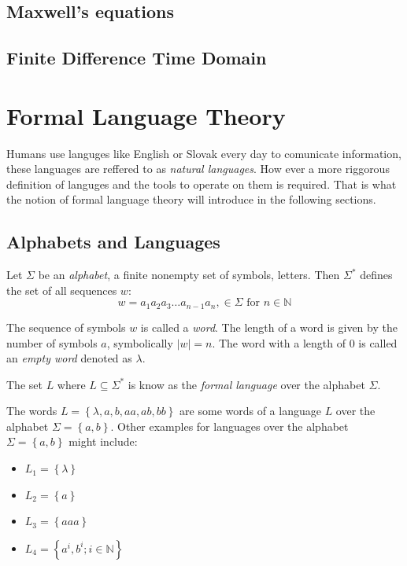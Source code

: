 \subsection*{Maxwell's equations}



\subsection*{Finite Difference Time Domain}
\section{Formal Language Theory}
Humans use languges like English or Slovak every day to comunicate information, these languages are reffered to as \emph{natural languages}.  How ever a more riggorous definition of languges and the tools to operate on them is required. That is what the notion of formal language theory will introduce in the following sections.

\subsection{Alphabets and Languages}


\begin{definition}[Alphabet]
\label{def:alphabet}
Let $\Sigma$ be an \emph{alphabet}, a finite nonempty set of symbols, letters. Then $\Sigma ^{*}$ defines the set of all sequences $w$:
$$w= a_1 a_2 a_3 \dots a_{n-1} a_n, \in \Sigma \text{ for } n \in \mathbb{N}$$
\end{definition}

The sequence of symbols $w$ is called a \emph{word}. The length of a word is given by the number of symbols $a$, symbolically $|w| = n$. The word with a length of 0 is called an \emph{empty word} denoted as $\lambda$.

\begin{definition}[Language]
\label{def:language}
The set $L$ where $L\subseteq \Sigma^{*}$ is know as the \emph{formal language} over the alphabet $\Sigma$. 
\end{definition}
The words $L = \left\lbrace \lambda, a, b, aa, ab, bb \right\rbrace$ are some words of a language $L$ over the alphabet $\Sigma=\left\lbrace a,b \right\rbrace$.
Other examples for languages over the alphabet $\Sigma=\left\lbrace a,b \right\rbrace$ might include:
\begin{itemize}
\item $L_1 = \left\lbrace \lambda \right\rbrace$
\item $L_2 = \left\lbrace a \right\rbrace$
\item $L_3 = \left\lbrace aaa \right\rbrace$
\item $L_4 = \left\lbrace a^i,b^i; i \in \mathbb{N} \right\rbrace$
\end{itemize}





